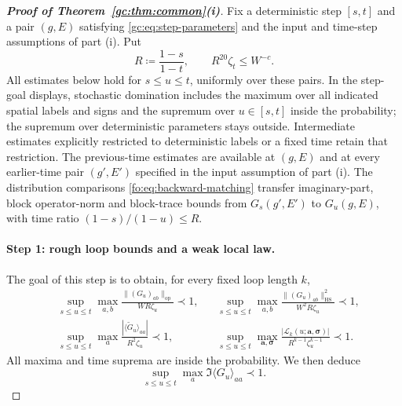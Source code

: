 \documentclass[11pt]{article}
\numberwithin{equation}{section}
\theoremstyle{remark}
\newcommand{\wt}{\widetilde}
\newcommand{\cL}{\mathcal L}
\newcommand{\op}{\mathrm{op}}
\newcommand{\HS}{\mathrm{HS}}
\begin{document}
\begin{proof}[\textbf{Proof of Theorem~\ref{gc:thm:common}(i)}]
Fix a deterministic step $[s,t]$ and a pair
$(g,E)$ satisfying \eqref{gc:eq:step-parameters} and the
input and time-step assumptions of part (i). Put
\[
 R\coloneqq\frac{1-s}{1-t},\qquad R^{20}\zeta_t\le W^{-c}.
\]
All estimates below hold for $s\le u\le t$, uniformly over these
pairs. In the step-goal displays, stochastic domination includes the
maximum over all indicated spatial labels and signs and the supremum
over $u\in[s,t]$ inside the probability; the supremum over deterministic
parameters stays outside. Intermediate estimates explicitly restricted
to deterministic labels or a fixed time retain that restriction. The previous-time estimates
are available at $(g,E)$ and at every earlier-time pair
$(g',E')$ specified in the input assumption of part (i).
The distribution comparisons \eqref{fo:eq:backward-matching} transfer
imaginary-part, block operator-norm and block-trace bounds from
$G_s(g',E')$ to $G_u(g,E)$, with time ratio
$(1-s)/(1-u)\le R$.

\paragraph{Step 1: rough loop bounds and a weak local law.}
The goal of this step is to obtain, for every fixed loop length $k$,
\begin{equation}\label{fo:eq:step1}
 \begin{aligned}
 &\sup_{s\le u\le t}\max_{a,b}
       \frac{\|(G_u)_{ab}\|_{\op}}{WR\zeta_u}\prec1,
 &&\sup_{s\le u\le t}\max_{a,b}
       \frac{\|(G_u)_{ab}\|_{\HS}^2}{W^2R\zeta_u}\prec1,\\
 &\sup_{s\le u\le t}\max_a
       \frac{|\langle\wt G_u\rangle_{aa}|}{R^2\zeta_u}\prec1,
 &&\sup_{s\le u\le t}\max_{\boldsymbol a,\boldsymbol\sigma}
       \frac{|\cL_k(u;\boldsymbol a,\boldsymbol\sigma)|}
       {R^{k-1}\zeta_u^{k-1}}\prec1.
 \end{aligned}
\end{equation}
All maxima and time suprema are inside the probability. We then deduce
\begin{equation}\label{fo:eq:step1-density}
 \sup_{s\le u\le t}\max_a\Im\langle G_u\rangle_{aa}\prec1.
\end{equation}


\end{proof}
\end{document}
